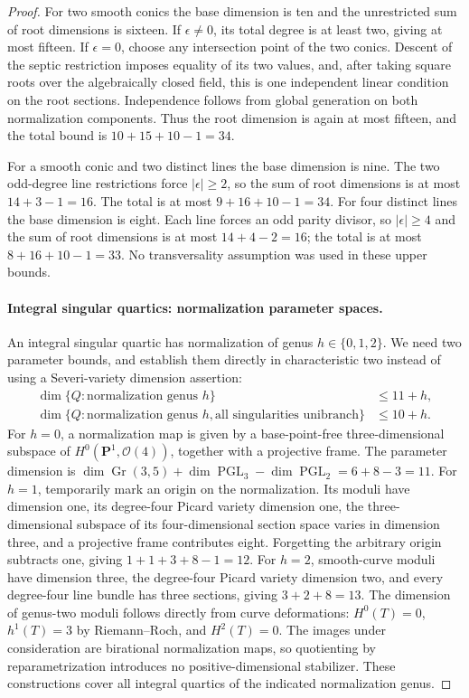 \begin{proof}
For two smooth conics the base dimension is ten and the unrestricted
sum of root dimensions is sixteen.  If $\epsilon\ne0$, its total
degree is at least two, giving at most fifteen.  If
$\epsilon=0$, choose any intersection point of the two conics.
Descent of the septic restriction imposes equality of its two values,
and, after taking square roots over the algebraically closed field,
this is one independent linear condition on the root sections.
Independence follows from global generation on both normalization
components.  Thus the root dimension is again at most fifteen,
and the total bound is $10+15+10-1=34$.

For a smooth conic and two distinct lines the base dimension is
nine.  The two odd-degree line restrictions force
$|\epsilon|\ge2$, so the sum of root dimensions is at most
$14+3-1=16$.  The total is at most $9+16+10-1=34$.
For four distinct lines the base dimension is eight.  Each line
forces an odd parity divisor, so $|\epsilon|\ge4$ and the sum of
root dimensions is at most $14+4-2=16$; the total is at most
$8+16+10-1=33$.  No transversality assumption was used in these
upper bounds.

\paragraph{Integral singular quartics: normalization parameter spaces.}
An integral singular quartic has normalization of genus
$h\in\{0,1,2\}$.  We need two parameter bounds, and establish them
directly in characteristic two instead of using a Severi-variety
dimension assertion:
\begin{align*}
 \dim\{Q:\text{normalization genus }h\}&\le11+h,\\
 \dim\{Q:\text{normalization genus }h,
          \text{all singularities unibranch}\}&\le10+h.
\end{align*}
For $h=0$, a normalization map is given by a base-point-free
three-dimensional subspace of $H^0(\mathbf P^1,\mathcal O(4))$,
together with a projective frame.  The parameter dimension is
$\dim\operatorname{Gr}(3,5)+\dim\operatorname{PGL}_3
 -\dim\operatorname{PGL}_2=6+8-3=11$.
For $h=1$, temporarily mark an origin on the normalization.  Its
moduli have dimension one, its degree-four Picard variety dimension
one, the three-dimensional subspace of its four-dimensional section
space varies in dimension three, and a projective frame contributes
eight.  Forgetting the arbitrary origin subtracts one, giving
$1+1+3+8-1=12$.
For $h=2$, smooth-curve moduli have dimension three, the degree-four
Picard variety dimension two, and every degree-four line bundle has
three sections, giving $3+2+8=13$.
The dimension of genus-two moduli follows directly from curve
deformations: $H^0(T)=0$, $h^1(T)=3$ by Riemann--Roch, and $H^2(T)=0$.
The images under consideration are birational normalization maps,
so quotienting by reparametrization introduces no positive-dimensional
stabilizer.  These constructions cover all integral quartics of the
indicated normalization genus.


\end{proof}
